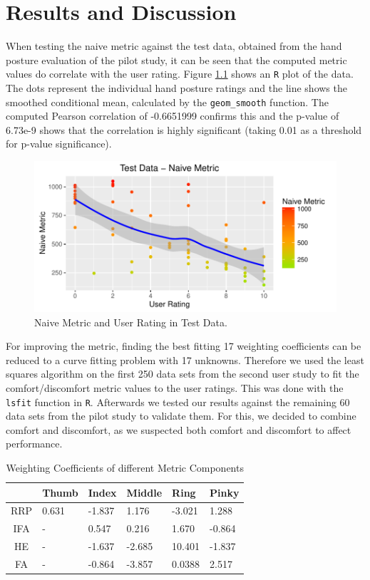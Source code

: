 \chapter{Results and Discussion}\label{chapter:results}

When testing the naive metric against the test data, obtained from the hand posture evaluation of the pilot study, it can be seen that the computed metric values do correlate with the user rating. Figure \ref{fig:testDataNaive} shows an \texttt{R} plot of the data. The dots represent the individual hand posture ratings and the line shows the smoothed conditional mean, calculated by the \texttt{geom\_smooth} function. The computed Pearson correlation of -0.6651999 confirms this and the p-value of 6.73e-9 shows that the correlation is highly significant (taking 0.01 as a threshold for p-value significance). 

\begin{figure}[h]
\includegraphics[width=\textwidth]{TestDataNaive}
\caption{Naive Metric and User Rating in Test Data.}
\label{fig:testDataNaive}
\end{figure}

For improving the metric, finding the best fitting 17 weighting coefficients can be reduced to a curve fitting problem with 17 unknowns. Therefore we used the least squares algorithm on the first 250 data sets from the second user study to fit the comfort/discomfort metric values to the user ratings. This was done with the \texttt{lsfit} function in \texttt{R}. Afterwards we tested our results against the remaining 60 data sets from the pilot study to validate them. For this, we decided to combine comfort and discomfort, as we suspected both comfort and discomfort to affect performance.

\begin{table}
\centering
\caption{Weighting Coefficients of different Metric Components}
\label{tab:coeff}
\begin{tabular}{|c|l|l|l|l|l|} \hline
 &Thumb&Index&Middle&Ring&Pinky\\ \hline
RRP&0.631&-1.837&1.176&-3.021&1.288\\ \hline
IFA&-&0.547&0.216&1.670&-0.864\\ \hline
HE&-&-1.637&-2.685&10.401&-1.837\\ \hline
FA&-&-0.864&-3.857&0.0388&2.517\\
\hline\end{tabular}
\end{table}

